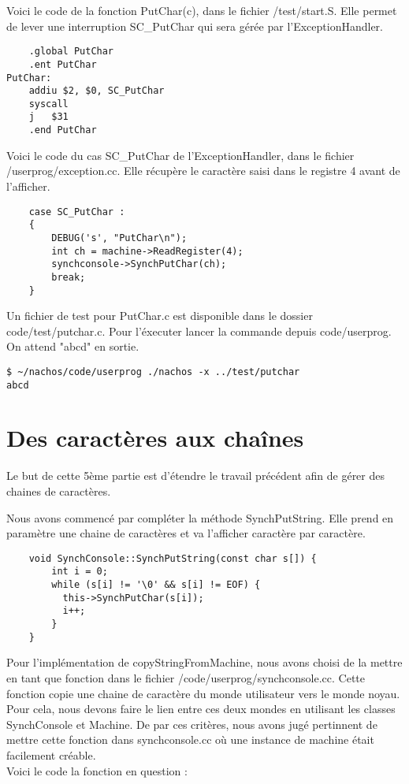 \documentclass[a4paper]{article}
\begin{document}
Voici le code de la fonction PutChar(c), dans le fichier /test/start.S. Elle
permet de lever une interruption SC\_PutChar qui sera gérée par l'ExceptionHandler.
\begin{verbatim}
    .global PutChar
    .ent PutChar
PutChar:
    addiu $2, $0, SC_PutChar
    syscall
    j   $31
    .end PutChar
\end{verbatim}

Voici le code du cas SC\_PutChar de l'ExceptionHandler, dans le fichier
/userprog/exception.cc. Elle récupère le caractère saisi dans le registre 4 avant
de l'afficher.

\begin{verbatim}
    case SC_PutChar :
    {
        DEBUG('s', "PutChar\n");
        int ch = machine->ReadRegister(4);
        synchconsole->SynchPutChar(ch);
        break;
    }
\end{verbatim}

Un fichier de test pour PutChar.c est disponible dans le dossier code/test/putchar.c.
Pour l'éxecuter lancer la commande depuis code/userprog. \\
On attend "abcd" en sortie.

\begin{verbatim}
$ ~/nachos/code/userprog ./nachos -x ../test/putchar
abcd
\end{verbatim}



\newpage
\section{Des caractères aux chaînes}

Le but de cette 5ème partie est d'étendre le travail précédent afin de gérer des
chaines de caractères.

Nous avons commencé par compléter la méthode SynchPutString. Elle prend en
paramètre une chaine de caractères et va l'afficher caractère par caractère.
\begin{verbatim}
	void SynchConsole::SynchPutString(const char s[]) {
	    int i = 0;
	    while (s[i] != '\0' && s[i] != EOF) {
	      this->SynchPutChar(s[i]);
	      i++;
	    }
	}
\end{verbatim}

Pour l'implémentation de copyStringFromMachine, nous avons choisi de la mettre
en tant que fonction dans le fichier /code/userprog/synchconsole.cc. Cette fonction
copie une chaine de caractère du monde utilisateur vers le monde noyau. Pour cela,
nous devons faire le lien entre ces deux mondes en utilisant les classes SynchConsole
et Machine. De par ces critères, nous avons jugé pertinnent de mettre cette fonction
dans synchconsole.cc où une instance de machine était facilement créable. \\
Voici le code la fonction en question :
\end{document}

